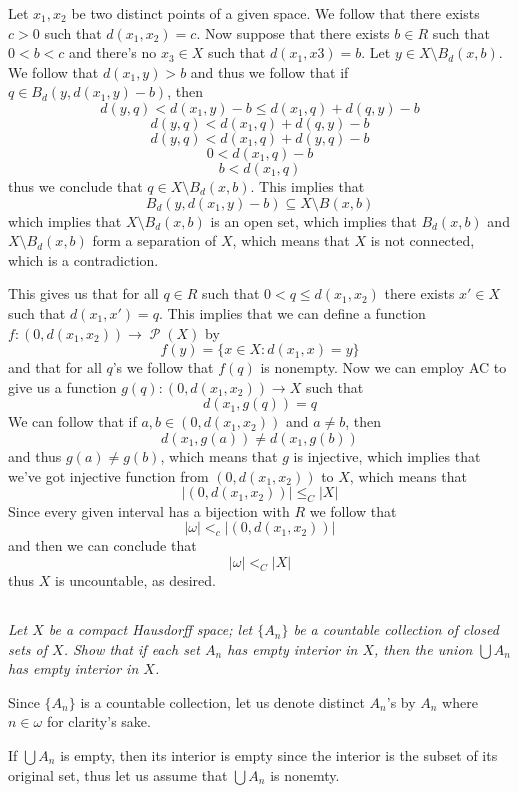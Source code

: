 \documentclass[11pt,oneside,titlepage]{book}
\DeclareMathOperator \pow {\mathcal {P}}
\newcommand{\set}[1]{\{ #1 \}}
\begin{document}
Let $x_1, x_2$ be two distinct  points of a given space. We follow that there exists
$c > 0$ such that $d(x_1, x_2) = c$. Now suppose that there exists $b \in R$ such that
$0 < b < c$  and there's no $x_3 \in X$ such that $d(x_1, x3) = b$. Let
$y \in X \setminus B_d(x, b)$. We follow that $d(x_1, y) > b$ and thus we follow that
if $q \in B_d(y, d(x_1, y) - b)$, then
$$d(y, q) < d(x_1, y) - b \leq d(x_1, q) + d(q, y) - b$$
$$d(y, q) < d(x_1, q) + d(q, y) - b$$
$$d(y, q) < d(x_1, q) + d(y, q) - b$$
$$0 < d(x_1, q) - b$$
$$b < d(x_1, q)$$
thus we conclude that $q \in X \setminus B_d(x, b)$. This implies that
$$B_d(y, d(x_1, y) - b) \subseteq X \setminus B(x, b)$$
which implies that $X \setminus B_d(x, b)$ is an open set, which implies that
$B_d(x, b)$ and $X \setminus B_d(x, b)$ form a separation of $X$, which means that $X$
is not connected, which is a contradiction.

This gives us that for all $q \in R$ such that  $0 < q \leq d(x_1, x_2)$ there
exists $x' \in X$ such that $d(x_1, x') = q$. This implies that we can define a function
$f: (0, d(x_1, x_2)) \to \pow(X)$ by
$$f(y) = \set{x \in X: d(x_1, x) = y}$$
and that for all $q$'s we follow that $f(q)$ is nonempty. Now we can employ AC to give us a
function $g(q): (0, d(x_1, x_2)) \to X$ such that
$$d(x_1, g(q)) = q$$
We can follow that if $a, b \in (0, d(x_1, x_2))$ and $a \neq b$, then
$$d(x_1, g(a)) \neq d(x_1, g(b))$$
and thus $g(a) \neq g(b)$, which means that $g$ is injective, which implies that we've got
injective function from $(0, d(x_1, x_2))$ to $X$, which means that
$$|(0, d(x_1, x_2))| \leq_C |X|$$
Since every given interval has a bijection with $R$ we follow that 
$$|\omega| <_c|(0, d(x_1, x_2))|$$
and then we can conclude that
$$|\omega| <_C |X|$$
thus $X$ is uncountable, as desired.

\subsection{}

\textit{Let $X$ be a compact Hausdorff space; let $\set{A_n}$ be a countable collection of
  closed sets of $X$. Show that if each set $A_n$ has empty interior in $X$, then
  the union $\bigcup{A_n}$ has empty interior in $X$.}

Since $\set{A_n}$ is a countable collection, let us denote distinct $A_n$'s by $A_n$ where
$n \in \omega$ for clarity's sake.

If $\bigcup{A_n}$ is empty, then its interior is empty since the interior is the
subset of its original set, thus let us assume that $\bigcup{A_n}$ is nonemty.
\end{document}
